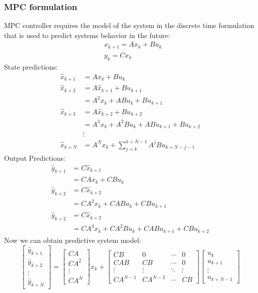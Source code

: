 \subsubsection{MPC formulation}
MPC controller requires the model of the system in the discrete time formulation that
is used to predict systems behavior in the future:
\begin{equation}
	\begin{split}
	&x_{k+1} = Ax_k + Bu_k\\
	&y_k = Cx_k
	\end{split}
\end{equation}
State predictions: 
\begin{equation}
\begin{split}
\hat{x}_{k+1} &= Ax_k + Bu_k\\
\hat{x}_{k+2} &= A\hat{x}_{k+1} + Bu_{k+1}\\
&= A^2x_k + ABu_k + Bu_{k+1}\\
\hat{x}_{k+3} &= A\hat{x}_{k+2} + Bu_{k+2}\\
&= A^3x_k + A^2Bu_k + ABu_{k+1} + Bu_{k+2}\\
&\vdots\\
\hat{x}_{k+N} &= A^Nx_k+\sum_{j=k}^{k+N-1}A^jBu_{k+N-j-1}
\end{split}
\end{equation}
Output Predictions:
\begin{equation}
\begin{split}
\hat{y}_{k+1} &= C\hat{x}_{k+1}\\
			  &= CAx_k + CBu_k\\
\hat{y}_{k+2} &= C\hat{x}_{k+2}\\
			  &= CA^2x_k + CABu_k + CBu_{k+1}\\
			  \hat{y}_{k+2} &= C\hat{x}_{k+2}\\
			  &= CA^3x_k + CA^2Bu_k + CABu_{k+1} + CBu_{k+2}
\end{split}
\end{equation}
Now we can obtain predictive system model:
\begin{equation}
	\begin{bmatrix}
	\hat{y}_{k+1}\\\hat{y}_{k+2}\\ \vdots\\ \hat{y}_{k+N}
	\end{bmatrix} = \begin{bmatrix}CA\\CA^2\\ \vdots \\ CA^N\end{bmatrix}x_k + \begin{bmatrix}CB& 0&\cdots&0\\
	CAB&CB&\cdots&0\\
	\vdots&\vdots&\ddots&\vdots\\
	CA^{N-1}&CA^{N-2}&\cdots&CB\end{bmatrix}\begin{bmatrix}u_k\\u_{k+1}\\\vdots\\u_{k+N-1}\end{bmatrix}
\end{equation}
